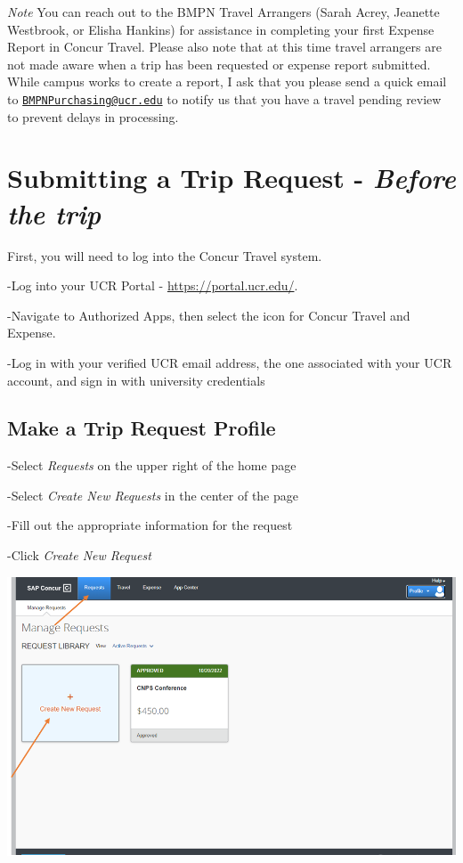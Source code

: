 \documentclass[
]{book}
\begin{document}
\emph{Note} You can reach out to the BMPN Travel Arrangers (Sarah Acrey, Jeanette Westbrook, or Elisha Hankins) for assistance in completing your first Expense Report in Concur Travel. Please also note that at this time travel arrangers are not made aware when a trip has been requested or expense report submitted. While campus works to create a report, I ask that you please send a quick email to \href{mailto:BMPNPurchasing@ucr.edu}{\nolinkurl{BMPNPurchasing@ucr.edu}} to notify us that you have a travel pending review to prevent delays in processing.

\hypertarget{submitting-a-trip-request---before-the-trip}{%
\section{\texorpdfstring{Submitting a Trip Request - \emph{Before the trip}}{Submitting a Trip Request - Before the trip}}\label{submitting-a-trip-request---before-the-trip}}

First, you will need to log into the Concur Travel system.

-Log into your UCR Portal - \url{https://portal.ucr.edu/}.

-Navigate to Authorized Apps, then select the icon for Concur Travel and Expense.

-Log in with your verified UCR email address, the one associated with your UCR account, and sign in with university credentials

\hypertarget{make-a-trip-request-profile}{%
\subsection{Make a Trip Request Profile}\label{make-a-trip-request-profile}}

-Select \emph{Requests} on the upper right of the home page

-Select \emph{Create New Requests} in the center of the page

-Fill out the appropriate information for the request

-Click \emph{Create New Request}

\begin{flushleft}\includegraphics[width=0.75\linewidth]{images/concur1} \end{flushleft}
\end{document}
